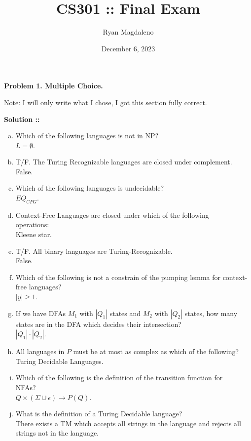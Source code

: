 \documentclass[11pt]{article}
\date{December 6, 2023}
\title{CS301 :: Final Exam}
\author{Ryan Magdaleno}
\begin{document}
\maketitle


\textbf{Problem 1. Multiple Choice.} 

Note: I will only write what I chose, I got this section fully correct.

\vspace{5px}\textbf{Solution ::}
\begin{enumerate}[a.]
    \item Which of the following languages is not in NP? \\ $L=\emptyset$.
    \item T/F. The Turing Recognizable languages are closed under complement. \\ False.
    \item Which of the following languages is undecidable? \\ $EQ_{CFG}$.
    \item Context-Free Languages are closed under which of the following \\
    operations:\\Kleene star.
    \item T/F. All binary languages are Turing-Recognizable.\\ False.
    \item Which of the following is not a constrain of the pumping lemma for
    context-free languages? \\ $|y|\ge 1$.
    \item If we have DFAs $M_1$ with $|Q_1|$ states and $M_2$ with $|Q_2|$ states,
    how many states are in the DFA which decides their intersection?
    \\$|Q_1|\cdot |Q_2|$.
    \item All languages in $P$ must be at most as complex as which of the following?\\
    Turing Decidable Languages.
    \item Which of the following is the definition of the transition function for 
    \\NFAs?\\
    $Q \times (\Sigma\cup\epsilon)\rightarrow P(Q)$.
    \item What is the definition of a Turing Decidable language? \\
    There exists a TM which accepts all strings in the language and rejects all
    strings not in the language.
\end{enumerate}
\pagebreak
\end{document}
